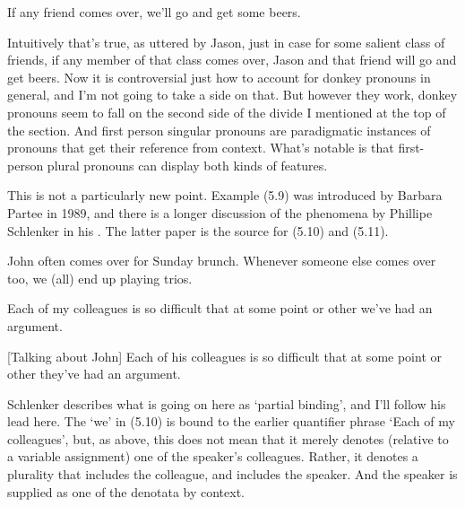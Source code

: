 \renewcommand{\labelenumi}{(5.\arabic{enumi})}
\begin{enumerate*}
\setcounter{enumi}{7}
\item If any friend comes over, we'll go and get some beers.
\end{enumerate*}

\noindent Intuitively that's true, as uttered by Jason, just in case for some salient class of friends, if any member of that class comes over, Jason and that friend will go and get beers. Now it is controversial just how to account for donkey pronouns in general, and I'm not going to take a side on that. But however they work, donkey pronouns seem to fall on the second side of the divide I mentioned at the top of the section. And first person singular pronouns are paradigmatic instances of pronouns that get their reference from context. What's notable is that first-person plural pronouns can display both kinds of features.

This is not a particularly new point. Example (5.9) was introduced by Barbara Partee in 1989, and there is a longer discussion of the phenomena by Phillipe Schlenker in his \citeyearpar{Schlenker2003}. The latter paper is the source for (5.10) and (5.11).

\renewcommand{\labelenumi}{(5.\arabic{enumi})}
\begin{enumerate*}
\setcounter{enumi}{8}
\item John often comes over for Sunday brunch. Whenever someone else comes over too, we (all) end up playing trios. \cite{Partee1989}

\item Each of my colleagues is so difficult that at some point or other we've had an argument. \cite{Schlenker2003}

\item {}[Talking about John] Each of his colleagues is so difficult that at some point or other they've had an argument. \cite{Schlenker2003}
\end{enumerate*}

\noindent Schlenker describes what is going on here as `partial binding', and I'll follow his lead here. The `we' in (5.10) is bound to the earlier quantifier phrase `Each of my colleagues', but, as above, this does not mean that it merely denotes (relative to a variable assignment) one of the speaker's colleagues. Rather, it denotes a plurality that includes the colleague, and includes the speaker. And the speaker is supplied as one of the denotata by context.


